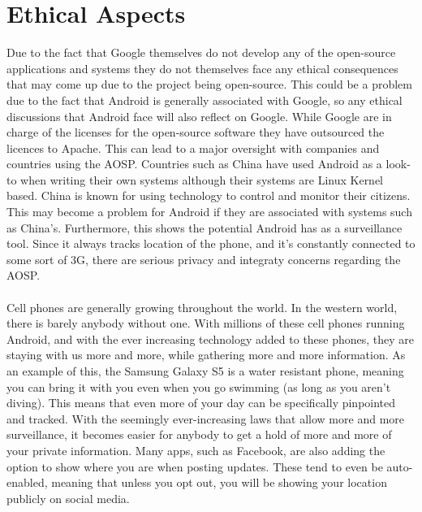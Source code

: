 \documentclass[conference]{IEEEtran}
\begin{document}
\section{Ethical Aspects}
\label{ethics}

Due to the fact that Google themselves do not develop any of the open-source applications and systems they do not themselves face any ethical consequences that may come up due to the project being open-source. This could be a problem due to the fact that Android is generally associated with Google, so any ethical discussions that Android face will also reflect on Google. While Google are in charge of the licenses for the open-source software they have outsourced the licences to Apache.\cite{android-licenses} This can lead to a major oversight with companies and countries using the AOSP. Countries such as China have used Android as a look-to when writing their own systems\cite{country-license} although their systems are Linux Kernel based. China is known for using technology to control and monitor their citizens. This may become a problem for Android if they are associated with systems such as China's. Furthermore, this shows the potential Android has as a surveillance tool. Since it always tracks location of the phone, and it's constantly connected to some sort of 3G, there are serious privacy and integraty concerns regarding the AOSP. 
\\\\Cell phones are generally growing throughout the world. In the western world, there is barely anybody without one. With millions of these cell phones running Android, and with the ever increasing technology added to these phones, they are staying with us more and more, while gathering more and more information. As an example of this, the Samsung Galaxy S5 is a water resistant phone, meaning you can bring it with you even when you go swimming (as long as you aren't diving). This means that even more of your day can be specifically pinpointed and tracked. With the seemingly ever-increasing laws that allow more and more surveillance, it becomes easier for anybody to get a hold of more and more of your private information.  Many apps, such as Facebook, are also adding the option to show where you are when posting updates. These tend to even be auto-enabled, meaning that unless you opt out, you will be showing your location publicly on social media. 
\end{document}
